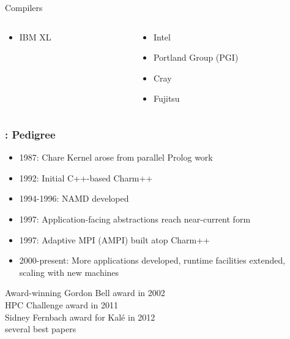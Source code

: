 \begin{frame}[t]
{{\begin{block}{\small Compilers}
\begin{columns}
\begin{column}{0.45\textwidth}
\begin{itemize}
            \item IBM XL
        \end{itemize}
    \end{column}
    \begin{column}{0.45\textwidth}
        \begin{itemize}
            \item Intel
            \item Portland Group (PGI)
            \item Cray
            \item Fujitsu
        \end{itemize}
    \end{column}
    \end{columns}
\end{block}
}
}
\end{frame}


\begin{frame}[t]
\frametitle{\charm: Pedigree}
\begin{itemize}
\item 1987: Chare Kernel arose from parallel Prolog work
\item 1992: Initial C++-based Charm++
\item 1994-1996: NAMD developed
\item 1997: Application-facing abstractions reach near-current form
\item 1997: Adaptive MPI (AMPI) built atop Charm++
\item 2000-present: More applications developed, runtime facilities extended, scaling with new machines
\end{itemize}
\pause
\begin{block}{Award-winning}
{\scriptsize
Gordon Bell award in 2002\\
HPC Challenge award in 2011\\
Sidney Fernbach award for Kal\'e in 2012\\
several best papers
}
\end{block}
\end{frame}
